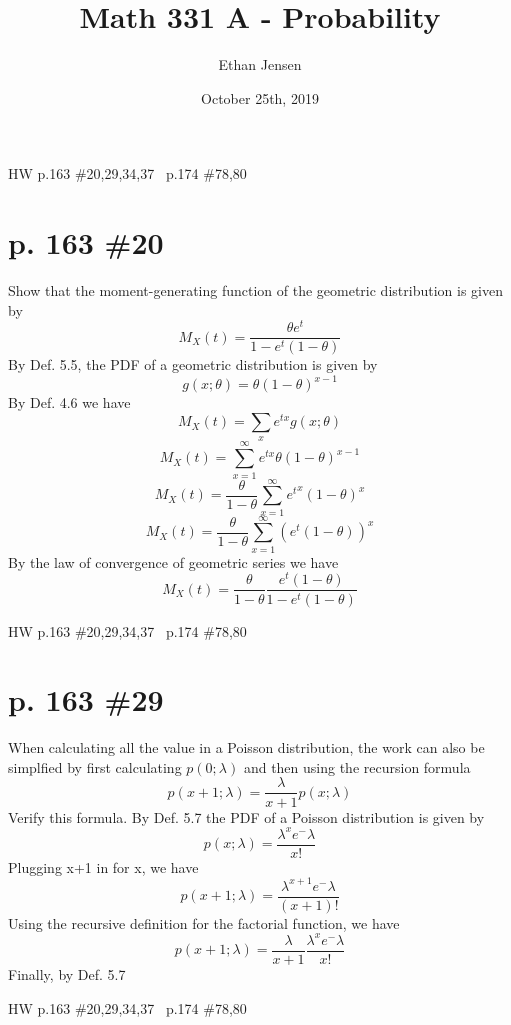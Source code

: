 \documentclass[12pt]{article}
\title{Math 331 A - Probability}
\author{Ethan Jensen}
\date{October 25th, 2019}
\begin{document}
	\maketitle HW p.163 \#20,29,34,37 \ p.174 \#78,80
	\section[20pt]{p. 163 \#20}
	Show that the moment-generating function of the geometric distribution is given by
	\[M_X(t)=\frac{\theta e^t}{1-e^t(1-\theta)}\]
	\newline
	By Def. 5.5, the PDF of a geometric distribution is given by
	\[g(x;\theta)=\theta(1-\theta)^{x-1}\]
	By Def. 4.6 we have
	\[M_X(t)=\sum_xe^{tx}g(x;\theta)\]
	\[M_X(t)=\sum_{x=1}^{\infty}e^{tx}\theta(1-\theta)^{x-1}\]
	\[M_X(t)=\frac{\theta}{1-\theta}\sum_{x=1}^{\infty}{e^t}^x(1-\theta)^{x}\]
	\[M_X(t)=\frac{\theta}{1-\theta}\sum_{x=1}^{\infty}(e^t(1-\theta))^{x}\]
	By the law of convergence of geometric series we have
	\[M_X(t)=\frac{\theta}{1-\theta}\frac{e^t(1-\theta)}{1-e^t(1-\theta)}\]
	\newpage
	\maketitle HW p.163 \#20,29,34,37 \ p.174 \#78,80
	\section[20pt]{p. 163 \#29}
	When calculating all the value in a Poisson distribution, the work can also be simplfied by first calculating \(p(0;\lambda)\) and then using the recursion formula \[p(x+1;\lambda)=\frac{\lambda}{x+1}p(x;\lambda)\]
	Verify this formula.
	\newline
	\newline
	By Def. 5.7 the PDF of a Poisson distribution is given by
	\[p(x;\lambda)=\frac{\lambda^xe^-\lambda}{x!}\]
	Plugging x+1 in for x, we have
	\[p(x+1;\lambda)=\frac{\lambda^{x+1}e^-\lambda}{(x+1)!}\]
	Using the recursive definition for the factorial function, we have
	\[p(x+1;\lambda)=\frac{\lambda}{x+1}\frac{\lambda^{x}e^-\lambda}{x!}\]
	Finally, by Def. 5.7 \newline
	\newpage
	\maketitle HW p.163 \#20,29,34,37 \ p.174 \#78,80
\end{document}
